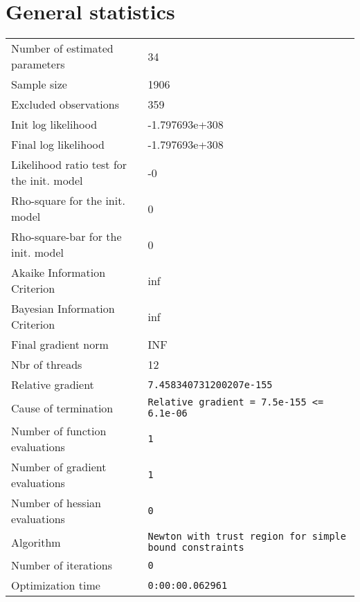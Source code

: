 



\section{General statistics}
\begin{tabular}{ll}
Number of estimated parameters & 34 \\
Sample size & 1906 \\
Excluded observations & 359 \\
Init log likelihood & -1.797693e+308 \\
Final log likelihood & -1.797693e+308 \\
Likelihood ratio test for the init. model & -0 \\
Rho-square for the init. model & 0 \\
Rho-square-bar for the init. model & 0 \\
Akaike Information Criterion & inf \\
Bayesian Information Criterion & inf \\
Final gradient norm & INF \\
Nbr of threads & 12 \\
Relative gradient & \verb$7.458340731200207e-155$ \\
Cause of termination & \verb$Relative gradient = 7.5e-155 <= 6.1e-06$ \\
Number of function evaluations & \verb$1$ \\
Number of gradient evaluations & \verb$1$ \\
Number of hessian evaluations & \verb$0$ \\
Algorithm & \verb$Newton with trust region for simple bound constraints$ \\
Number of iterations & \verb$0$ \\
Optimization time & \verb$0:00:00.062961$ \\
\end{tabular}

